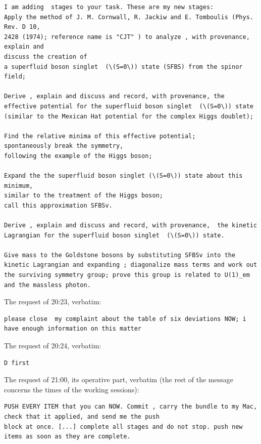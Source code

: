 \documentclass[
  10pt,
]{article}
\begin{document}
\begin{verbatim}
I am adding  stages to your task. These are my new stages:
Apply the method of J. M. Cornwall, R. Jackiw and E. Tomboulis (Phys. Rev. D 10,
2428 (1974); reference name is "CJT" ) to analyze , with provenance, explain and
discuss the creation of
a superfluid boson singlet  (\(S=0\)) state (SFBS) from the spinor field;

Derive , explain and discuss and record, with provenance, the effective potential for the superfluid boson singlet  (\(S=0\)) state (similar to the Mexican Hat potential for the complex Higgs doublet);

Find the relative minima of this effective potential; 
spontaneously break the symmetry, 
following the example of the Higgs boson; 

Expand the the superfluid boson singlet (\(S=0\)) state about this minimum, 
similar to the treatment of the Higgs boson;
call this approximation SFBSv.

Derive , explain and discuss and record, with provenance,  the kinetic Lagrangian for the superfluid boson singlet  (\(S=0\)) state. 

Give mass to the Goldstone bosons by substituting SFBSv into the kinetic Lagrangian and expanding ; diagonalize mass terms and work out the surviving symmetry group; prove this group is related to U(1)_em and the massless photon.
\end{verbatim}

The request of 20:23, verbatim:

\begin{verbatim}
please close  my complaint about the table of six deviations NOW; i have enough information on this matter
\end{verbatim}

The request of 20:24, verbatim:

\begin{verbatim}
D first
\end{verbatim}

The request of 21:00, its operative part, verbatim (the rest of the
message concerns the times of the working sessions):

\begin{verbatim}
PUSH EVERY ITEM that you can NOW. Commit , carry the bundle to my Mac, check that it applied, and send me the push
block at once. [...] complete all stages and do not stop. push new items as soon as they are complete.
\end{verbatim}
\end{document}
